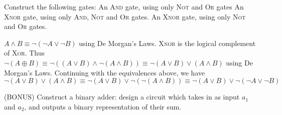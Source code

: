\documentclass[solution, letterpaper]{cs20inclass}
\begin{document}
\problem
Construct the following gates:
\subproblem An \textsc{And} gate, using only \textsc{Not} and \textsc{Or} gates
\subproblem An \textsc{Xnor} gate, using only \textsc{And}, \textsc{Not} and \textsc{Or} gates.
\subproblem An \textsc{Xnor} gate, using only \textsc{Not} and \textsc{Or} gates.

\begin{solution}
\subsolution $A \land B \equiv \lnot (\lnot A \lor \lnot B)$ using De Morgan's Laws.
\subsolution \textsc{Xnor} is the logical complement of \textsc{Xor}. Thus $\lnot (A \oplus B) \equiv \lnot((A \lor B) \land \lnot (A \land B)) \equiv \lnot (A \lor B) \lor (A \land B)$ using De Morgan's Laws.
\subsolution Continuing with the equivalences above, we have $\lnot (A \lor B) \lor (A \land B) \equiv \lnot (A \lor B) \lor \lnot (\lnot (A \land B)) \equiv \lnot (A \lor B) \lor \lnot (\lnot A \lor \lnot B)$
\end{solution}
  
\problem
(BONUS) Construct a binary adder: design a circuit which takes in as input $a_1$ and $a_2$, and outputs a binary representation of their sum.
\end{document}
